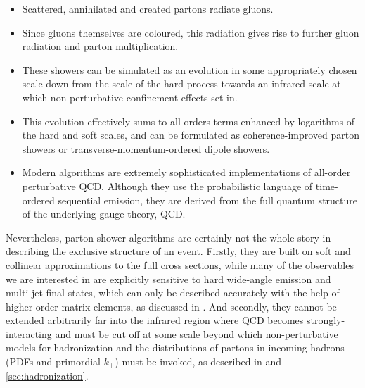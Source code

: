 \begin{itemize}
\item Scattered, annihilated and created partons radiate gluons.
\item Since gluons themselves are coloured, this radiation gives rise to
  further gluon radiation and parton multiplication.
\item These showers can be simulated as an evolution in some
  appropriately chosen scale down from the scale of the hard process
  towards an infrared scale at which non-perturbative confinement
  effects set in.
\item This evolution effectively sums to all orders terms enhanced by
  logarithms of the hard and soft scales, and can be formulated as
  coherence-im\-proved parton showers or transverse-momentum-ordered
  dipole showers.
\item Modern algorithms are extremely sophisticated implementations of
  all-order perturbative QCD.  Although they use the probabilistic
  language of time-ordered sequential emission, they are derived from
  the full quantum structure of the underlying gauge theory, QCD.
\end{itemize}

Nevertheless, parton shower algorithms are certainly not the whole story
in describing the exclusive structure of an event.  Firstly, they are
built on soft and collinear approximations to the full cross sections,
while many of the observables we are interested in are explicitly
sensitive to hard wide-angle emission and multi-jet final states, which
can only be described accurately with the help of higher-order matrix
elements, as discussed in .  And secondly,
they cannot be extended arbitrarily far into the infrared region where
QCD becomes strongly-interacting and must be cut off at some scale
beyond which non-perturbative models for hadronization and the
distributions of partons in incoming hadrons (\ie PDFs and primordial
$k_\perp$) must be invoked, as described in
 and \ref{sec:hadronization}.

